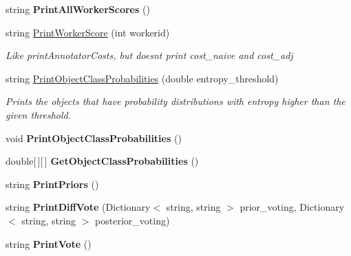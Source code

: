 \begin{DoxyCompactItemize}
\item 
\hypertarget{class_get_another_label_1_1_dawid_skene_aa468a9193551e38fd1ec50362eb940b0}{}string {\bfseries Print\+All\+Worker\+Scores} ()\label{class_get_another_label_1_1_dawid_skene_aa468a9193551e38fd1ec50362eb940b0}

\item 
string \hyperlink{class_get_another_label_1_1_dawid_skene_a24753822a3c4006d3311034936eae3c5}{Print\+Worker\+Score} (int workerid)
\begin{DoxyCompactList}\small\item\em Like print\+Annotator\+Costs, but doesn\textquotesingle{}t print cost\+\_\+naive and cost\+\_\+adj \end{DoxyCompactList}\item 
string \hyperlink{class_get_another_label_1_1_dawid_skene_a017f107bf478055a678308c0142bc54c}{Print\+Object\+Class\+Probabilities} (double entropy\+\_\+threshold)
\begin{DoxyCompactList}\small\item\em Prints the objects that have probability distributions with entropy higher than the given threshold. \end{DoxyCompactList}\item 
\hypertarget{class_get_another_label_1_1_dawid_skene_a9ee90b841c0e01dfa1c37e4b707faff2}{}void {\bfseries Print\+Object\+Class\+Probabilities} ()\label{class_get_another_label_1_1_dawid_skene_a9ee90b841c0e01dfa1c37e4b707faff2}

\item 
\hypertarget{class_get_another_label_1_1_dawid_skene_a84af6e79ba113e8e1e5edb05e004372e}{}double\mbox{[}$\,$\mbox{]}\mbox{[}$\,$\mbox{]} {\bfseries Get\+Object\+Class\+Probabilities} ()\label{class_get_another_label_1_1_dawid_skene_a84af6e79ba113e8e1e5edb05e004372e}

\item 
\hypertarget{class_get_another_label_1_1_dawid_skene_a49b67c96115292101cfa3a5dbf3827dd}{}string {\bfseries Print\+Priors} ()\label{class_get_another_label_1_1_dawid_skene_a49b67c96115292101cfa3a5dbf3827dd}

\item 
\hypertarget{class_get_another_label_1_1_dawid_skene_a586cba68bdc9752a39e2bfb2bcda6f43}{}string {\bfseries Print\+Diff\+Vote} (Dictionary$<$ string, string $>$ prior\+\_\+voting, Dictionary$<$ string, string $>$ posterior\+\_\+voting)\label{class_get_another_label_1_1_dawid_skene_a586cba68bdc9752a39e2bfb2bcda6f43}

\item 
\hypertarget{class_get_another_label_1_1_dawid_skene_a85c600bc6876021af8f2875dd8502464}{}string {\bfseries Print\+Vote} ()\label{class_get_another_label_1_1_dawid_skene_a85c600bc6876021af8f2875dd8502464}

\end{DoxyCompactItemize}
